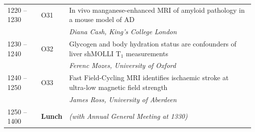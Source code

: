 \documentclass[a5paper,10pt,twoside,onecolumn,openany,helvetica,showtrims]{memoir}
\newlength{\JackBoxOne}
\newlength{\JackBoxTwo}
\newlength{\JackBoxThree}
\newlength{\LittleSkip}
\newcommand{\talkauthor}[1]{\small\emph{#1}}
\begin{document}
\begin{longtable}{p{\JackBoxOne}p{\JackBoxTwo}p{\JackBoxThree}}
1220 -- 1230 & O31 & In vivo manganese-enhanced MRI of amyloid pathology in a mouse model of AD  \\
& & \talkauthor{Diana Cash, King's College London}\\
1230 -- 1240 & O32 & Glycogen and body hydration status are confounders of liver shMOLLI T$_1$ measurements  \\
& & \talkauthor{Ferenc Mozes, University of Oxford}\\
1240 -- 1250 & O33 & Fast Field-Cycling MRI identifies ischaemic stroke at ultra-low magnetic field strength  \\
& & \talkauthor{James Ross, University of Aberdeen}\\[\LittleSkip]
1250 -- 1400 & \textbf{Lunch} & \hfill\emph{(with Annual General Meeting at 1330)}
\end{longtable}
\end{document}
